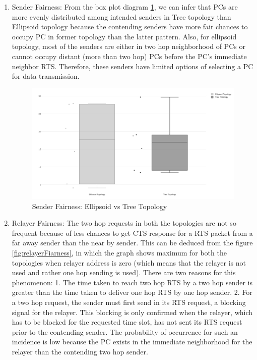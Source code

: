     \begin{enumerate}
        \item Sender Fairness: From the box plot diagram \ref{fig:boxplot_treeVsEllipsoid}, we can infer that \acp{PC} are more evenly distributed among intended senders in Tree topology than Ellipsoid topology because the contending senders have more fair chances to occupy \ac{PC} in former topology than the latter pattern. Also, for ellipsoid topology, most of the senders are either in two hop neighborhood of \acp{PC} or cannot occupy distant (more than two hop) \acp{PC} before the \ac{PC}'s immediate neighbor \ac{RTS}. Therefore, these senders have limited options of selecting a \ac{PC} for data transmission.
        
    	\begin{figure}
        \centering
        \includegraphics[width=1.0\textwidth]{gfx/RPlots/boxplot_senderFairnessComparison.png}
        \caption{Sender Fairness: Ellipsoid vs Tree Topology}
        \label{fig:boxplot_treeVsEllipsoid}
        \end{figure}
    
        \item Relayer Fairness: The two hop requests in both the topologies are not so frequent because of less chances to get \ac{CTS} response for a \ac{RTS} packet from a far away sender than the near by sender. This can be deduced from the figure \ref{fig:relayerFiarness}, in which the graph shows maximum for both the topologies when relayer address is zero (which means that the relayer is not used and rather one hop sending is used). There are two reasons for this phenomenon: 1. The time taken to reach two hop \ac{RTS} by a two hop sender is greater than the time taken to deliver one hop \ac{RTS} by one hop sender. 2. For a two hop request, the sender must first send in its \ac{RTS} request, a blocking signal for the relayer. This blocking is only confirmed when the relayer, which has to be blocked for the requested time slot, has not sent its \ac{RTS} request prior to the contending sender. The probability of occurrence for such an incidence is low because the \ac{PC} exists in the immediate neighborhood for the relayer than the contending two hop sender.
        

\end{enumerate}
